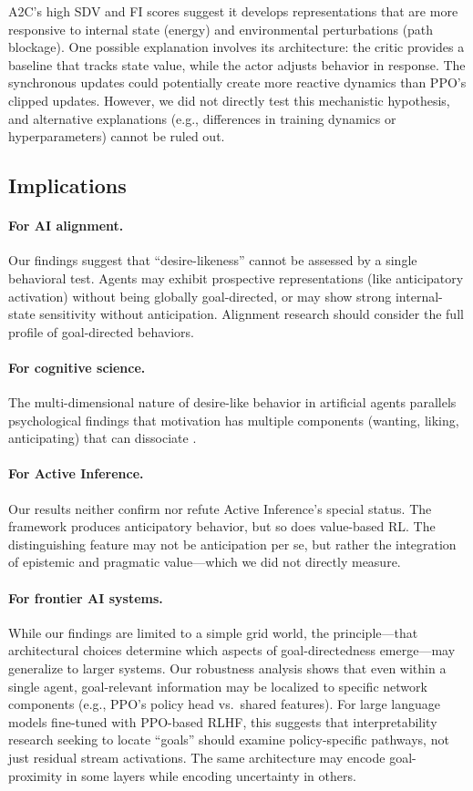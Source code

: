 \documentclass{article}
\begin{document}
A2C's high SDV and FI scores suggest it develops representations that are more responsive to internal state (energy) and environmental perturbations (path blockage). One possible explanation involves its architecture: the critic provides a baseline that tracks state value, while the actor adjusts behavior in response. The synchronous updates could potentially create more reactive dynamics than PPO's clipped updates. However, we did not directly test this mechanistic hypothesis, and alternative explanations (e.g., differences in training dynamics or hyperparameters) cannot be ruled out.

\subsection{Implications}

\paragraph{For AI alignment.} Our findings suggest that ``desire-likeness'' cannot be assessed by a single behavioral test. Agents may exhibit prospective representations (like anticipatory activation) without being globally goal-directed, or may show strong internal-state sensitivity without anticipation. Alignment research should consider the full profile of goal-directed behaviors.

\paragraph{For cognitive science.} The multi-dimensional nature of desire-like behavior in artificial agents parallels psychological findings that motivation has multiple components (wanting, liking, anticipating) that can dissociate \cite{berridge2009dissecting}.

\paragraph{For Active Inference.} Our results neither confirm nor refute Active Inference's special status. The framework produces anticipatory behavior, but so does value-based RL. The distinguishing feature may not be anticipation per se, but rather the integration of epistemic and pragmatic value---which we did not directly measure.

\paragraph{For frontier AI systems.} While our findings are limited to a simple grid world, the principle---that architectural choices determine which aspects of goal-directedness emerge---may generalize to larger systems. Our robustness analysis shows that even within a single agent, goal-relevant information may be localized to specific network components (e.g., PPO's policy head vs.\ shared features). For large language models fine-tuned with PPO-based RLHF, this suggests that interpretability research seeking to locate ``goals'' should examine policy-specific pathways, not just residual stream activations. The same architecture may encode goal-proximity in some layers while encoding uncertainty in others.
\end{document}
